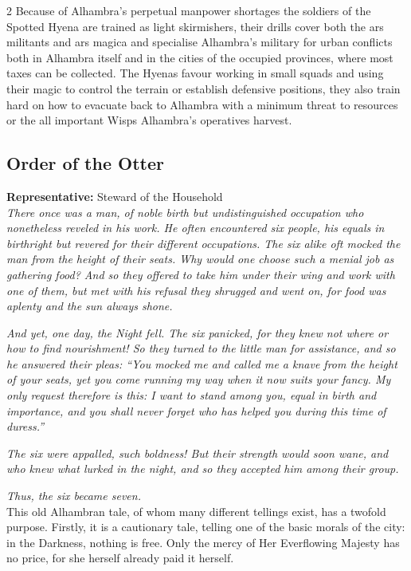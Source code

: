 \begin{multicols}{2}
Because of Alhambra's perpetual manpower shortages the soldiers of the Spotted Hyena are trained as light skirmishers, their drills cover both the ars militants and ars magica and specialise Alhambra's military for urban conflicts both in Alhambra itself and in the cities of the occupied provinces, where most taxes can be collected. The Hyenas favour working in small squads and using their magic to control the terrain or establish defensive positions, they also train hard on how to evacuate back to Alhambra with a minimum threat to resources or the all important Wisps Alhambra's operatives harvest. 

\subsection*{Order of the Otter}
\textbf{Representative:} Steward of the Household\\

\noindent \textit{There once was a man, of noble birth but undistinguished occupation who nonetheless reveled in his work. He often encountered six people, his equals in birthright but revered for their different occupations. The six alike oft mocked the man from the height of their seats. Why would one choose such a menial job as gathering food? And so they offered to take him under their wing and work with one of them, but met with his refusal they shrugged and went on, for food was aplenty and the sun always shone.}

\textit{And yet, one day, the Night fell. The six panicked, for they knew not where or how to find nourishment! So they turned to the little man for assistance, and so he answered their pleas: \textquotedblleft You mocked me and called me a knave from the height of your seats, yet you come running my way when it now suits your fancy. My only request therefore is this: I want to stand among you, equal in birth and importance, and you shall never forget who has helped you during this time of duress.\textquotedblright}

\textit{The six were appalled, such boldness! But their strength would soon wane, and who knew what lurked in the night, and so they accepted him among their group.}

\textit{Thus, the six became seven.}\\

\noindent This old Alhambran tale, of whom many different tellings exist, has a twofold purpose. Firstly, it is a cautionary tale, telling one of the basic morals of the city: in the Darkness, nothing is free. Only the mercy of Her Everflowing Majesty has no price, for she herself already paid it herself.


\end{multicols}
